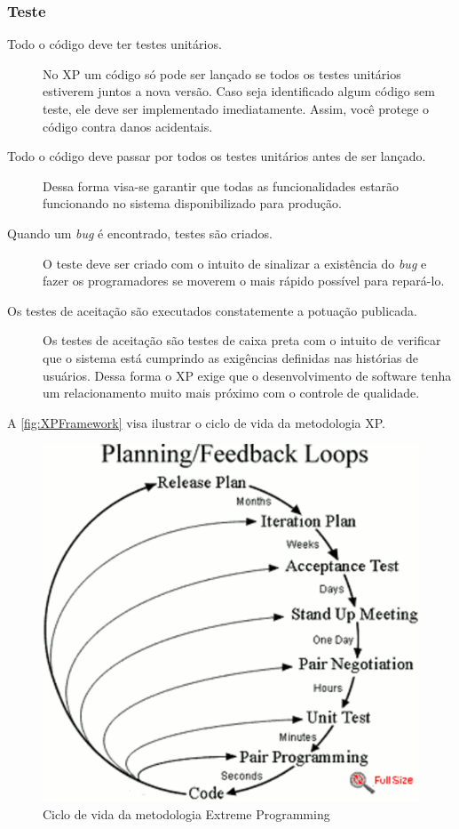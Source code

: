 \subsubsection{Teste}
\begin{description}
    \item[Todo o código deve ter testes unitários.] No \gls{XP} um código só pode ser
    lançado se todos os testes unitários estiverem juntos a nova versão. Caso seja
    identificado algum código sem teste, ele deve ser implementado imediatamente. Assim,
    você protege o código contra danos acidentais.
    \item[Todo o código deve passar por todos os testes unitários antes de ser lançado.]
    Dessa forma visa-se garantir que todas as funcionalidades estarão funcionando no
    sistema disponibilizado para produção.
    \item[Quando um \textit{bug} é encontrado, testes são criados.] O teste deve ser
    criado com o intuito de sinalizar a existência do \textit{bug} e fazer os
    programadores se moverem o mais rápido possível para repará-lo.
    \item[Os testes de aceitação são executados constatemente a potuação publicada.]
    Os testes de aceitação são testes de caixa preta com o intuito de verificar que
    o sistema está cumprindo as exigências definidas nas histórias de usuários. Dessa
    forma o \gls{XP} exige que o desenvolvimento de software tenha um relacionamento
    muito mais próximo com o controle de qualidade.
\end{description}

A \autoref{fig:XPFramework} visa ilustrar o ciclo de vida da metodologia \acrlong{XP}.

    \begin{figure}[h]
      \caption{Ciclo de vida da metodologia  Extreme Programming\label{fig:XPFramework}}
      \centering
      \includegraphics[keepaspectratio=true,scale=0.8]{figuras/xpFramework.eps}
    \end{figure}

